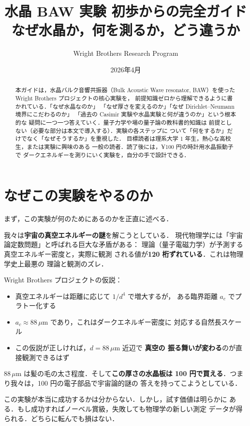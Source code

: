 \documentclass[11pt,a4paper]{article}
\title{水晶 BAW 実験 初歩からの完全ガイド\\
\large なぜ水晶か，何を測るか，どう違うか}
\author{Wright Brothers Research Program}
\date{2026年4月}
\begin{document}
\maketitle

\begin{abstract}
本ガイドは，水晶バルク音響共振器（Bulk Acoustic Wave resonator,
BAW）を使った Wright Brothers プロジェクトの核心実験を，
前提知識ゼロから理解できるように書かれている．「なぜ水晶なのか」
「なぜ厚さを変えるのか」「なぜ Dirichlet--Neumann 境界にこだわるのか」
「過去の Casimir 実験や水晶実験と何が違うのか」という根本的な
疑問に一つ一つ答えていく．量子力学や場の量子論の教科書的知識は
前提としない（必要な部分は本文で導入する）．実験の各ステップに
ついて「何をするか」だけでなく「なぜそうするか」を重視した．
目標読者は理系大学 1 年生，熱心な高校生，または実験に興味のある
一般の読者．読了後には，¥100 円の時計用水晶振動子で
ダークエネルギーを測りにいく実験を，自分の手で設計できる．
\end{abstract}

\tableofcontents

\newpage
\section{なぜこの実験をやるのか}

まず，この実験が何のためにあるのかを正直に述べる．

我々は\textbf{宇宙の真空エネルギーの謎}を解こうとしている．
現代物理学には「宇宙論定数問題」と呼ばれる巨大な矛盾がある：
理論（量子電磁力学）が予測する真空エネルギー密度と，実際に観測
される値が\textbf{120 桁ずれている}．これは物理学史上最悪の
理論と観測のズレ．

Wright Brothers プロジェクトの仮説：
\begin{itemize}
\item 真空エネルギーは距離に応じて $1/d^4$ で増大するが，
ある臨界距離 $a_c$ でプラトー化する
\item $a_c \approx 88\,\mu$m であり，これはダークエネルギー密度に
対応する自然長スケール
\item この仮説が正しければ，$d = 88\,\mu$m 近辺で \textbf{真空の
振る舞いが変わる}のが直接観測できるはず
\end{itemize}

$88\,\mu$m は髪の毛の太さ程度．そして\textbf{この厚さの水晶板は
100 円で買える}．つまり我々は，100 円の電子部品で宇宙論的謎の
答えを持ってこようとしている．

この実験が本当に成功するかは分からない．しかし，試す価値は明らかに
ある．もし成功すればノーベル賞級，失敗しても物理学の新しい測定
データが得られる．どちらに転んでも損はない．
\end{document}
